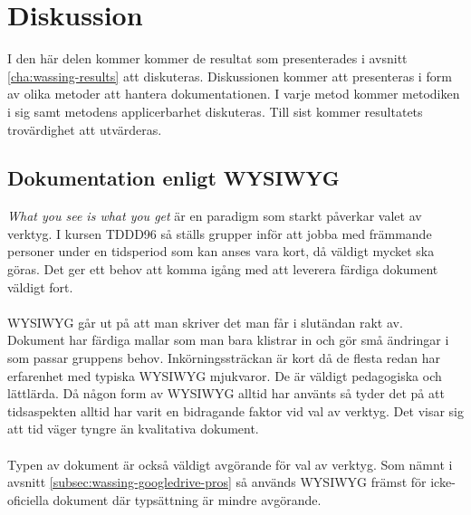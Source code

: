 
\chapter{Diskussion}
\label{cha:wassing-discussion}

I den här delen kommer kommer de resultat som presenterades i avsnitt \ref{cha:wassing-results} att diskuteras. Diskussionen kommer att presenteras i form av olika metoder att hantera dokumentationen. I varje metod kommer metodiken i sig samt metodens applicerbarhet diskuteras. Till sist kommer resultatets trovärdighet att utvärderas.

\section{Dokumentation enligt WYSIWYG}
\textit{What you see is what you get} är en paradigm som starkt påverkar valet av verktyg. I kursen TDDD96 så ställs grupper inför att jobba med främmande personer under en tidsperiod som kan anses vara kort, då väldigt mycket ska göras. Det ger ett behov att komma igång med att leverera färdiga dokument väldigt fort.\\ \\
WYSIWYG går ut på att man skriver det man får i slutändan rakt av. Dokument har färdiga mallar som man bara klistrar in och gör små ändringar i som passar gruppens behov. Inkörningssträckan är kort då de flesta redan har erfarenhet med typiska WYSIWYG mjukvaror. De är väldigt pedagogiska och lättlärda. Då någon form av WYSIWYG alltid har använts så tyder det på att tidsaspekten alltid har varit en bidragande faktor vid val av verktyg. Det visar sig att tid väger tyngre än kvalitativa dokument.
\\ \\
Typen av dokument är också väldigt avgörande för val av verktyg. Som nämnt i avsnitt \ref{subsec:wassing-googledrive-pros} så används WYSIWYG främst för icke-oficiella dokument där typsättning är mindre avgörande.

